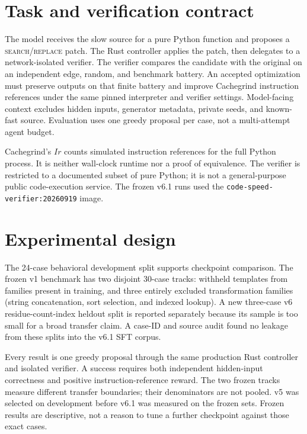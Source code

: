 \documentclass[11pt]{article}
\begin{document}
\section{Task and verification contract}
The model receives the slow source for a pure Python function and proposes a
\textsc{search}/\textsc{replace} patch. The Rust controller applies the patch,
then delegates to a network-isolated verifier. The verifier compares the
candidate with the original on an independent edge, random, and benchmark
battery. An accepted optimization must preserve outputs on that finite
battery and improve Cachegrind instruction references under the same pinned
interpreter and verifier settings. Model-facing context excludes hidden
inputs, generator metadata, private seeds, and known-fast source. Evaluation
uses one greedy proposal per case, not a multi-attempt agent budget.



Cachegrind's $Ir$ counts simulated instruction references for the full Python
process. It is neither wall-clock runtime nor a proof of equivalence. The
verifier is restricted to a documented subset of pure Python; it is not a
general-purpose public code-execution service. The frozen v6.1 runs used the
\texttt{code-speed-verifier:20260919} image.

\section{Experimental design}
The 24-case behavioral development split supports checkpoint comparison. The
frozen v1 benchmark has two disjoint 30-case tracks: withheld templates from
families present in training, and three entirely excluded transformation
families (string concatenation, sort selection, and indexed lookup). A new
three-case v6 residue-count-index heldout split is reported separately because
its sample is too small for a broad transfer claim. A case-ID and source audit
found no leakage from these splits into the v6.1 SFT corpus.

Every result is one greedy proposal through the same production Rust
controller and isolated verifier. A success requires both independent
hidden-input correctness and positive instruction-reference reward. The two
frozen tracks measure different transfer boundaries; their denominators are
not pooled. v5 was selected on development before v6.1 was measured on the
frozen sets. Frozen results are descriptive, not a reason to tune a further
checkpoint against those exact cases.
\end{document}
